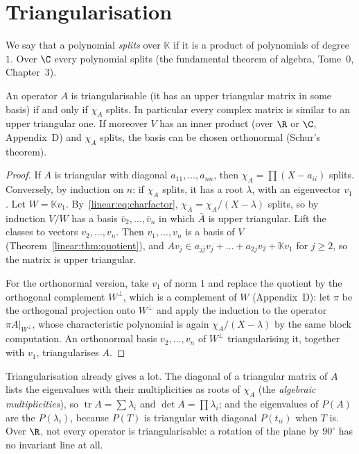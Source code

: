 \section{Triangularisation}

We say that a polynomial \emph{splits} over $\mathbb K$ if it is a product of polynomials of degree $1$. Over $\C$ every
polynomial splits (the fundamental theorem of algebra, Tome~0, Chapter~3).

\begin{theorem}[triangularisation]\label{linear:thm:schur}
An operator $A$ is triangularisable (it has an upper triangular matrix in some basis) if and only if $\chi_A$ splits.
In particular every complex matrix is similar to an upper triangular one. If moreover $V$ has an inner product (over $\R$
or $\C$, Appendix~D) and $\chi_A$ splits, the basis can be chosen orthonormal (Schur's theorem).
\end{theorem}
\begin{proof}
If $A$ is triangular with diagonal $a_{11},\dots,a_{nn}$, then $\chi_A=\prod(X-a_{ii})$ splits. Conversely, by induction on
$n$: if $\chi_A$ splits, it has a root $\lambda$, with an eigenvector $v_1$. Let $W=\mathbb Kv_1$. By~\eqref{linear:eq:charfactor},
$\chi_{\bar A}=\chi_A/(X-\lambda)$ splits, so by induction $V/W$ has a basis $\bar v_2,\dots,\bar v_n$ in which $\bar A$ is
upper triangular. Lift the classes to vectors $v_2,\dots,v_n$. Then $v_1,\dots,v_n$ is a basis of $V$ (Theorem~\ref{linear:thm:quotient}),
and $Av_j\in a_{jj}v_j+\dots+a_{2j}v_2+\mathbb Kv_1$ for $j\ge2$, so the matrix is upper triangular.

For the orthonormal version, take $v_1$ of norm $1$ and replace the quotient by the orthogonal complement $W^\perp$, which
is a complement of $W$ (Appendix~D): let $\pi$ be the orthogonal projection onto $W^\perp$ and apply the induction to
the operator $\pi A|_{W^\perp}$, whose characteristic polynomial is again $\chi_A/(X-\lambda)$ by the same block computation.
An orthonormal basis $v_2,\dots,v_n$ of $W^\perp$ triangularising it, together with $v_1$, triangularises $A$.
\end{proof}

Triangularisation already gives a lot. The diagonal of a triangular matrix of $A$ lists the eigenvalues with their
multiplicities as roots of $\chi_A$ (the \emph{algebraic multiplicities}), so $\operatorname{tr}A=\sum\lambda_i$ and
$\det A=\prod\lambda_i$; and the eigenvalues of $P(A)$ are the $P(\lambda_i)$, because $P(T)$ is triangular with diagonal
$P(t_{ii})$ when $T$ is. Over $\R$, not every operator is triangularisable: a rotation of the plane by $90^\circ$ has no
invariant line at all.

